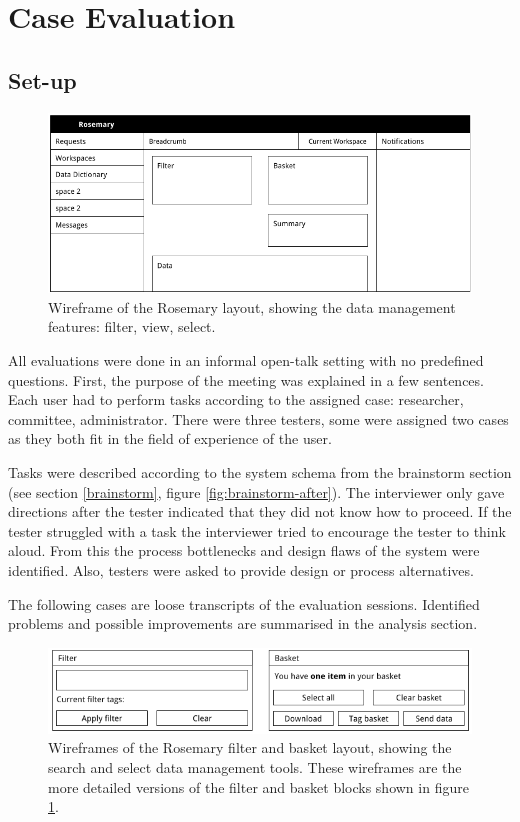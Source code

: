 \section{Case Evaluation}

\subsection{Set-up}
\label{evaluation-setup}

\begin{figure}[!b]
	\centering
	\includegraphics[width=1.0\linewidth]{images/evaluation-layout}
	\caption{
		Wireframe of the Rosemary layout, showing the data management features: filter, view, select.
	}
	\label{fig:evaluation-layout}
\end{figure}

All evaluations were done in an informal open-talk setting with no predefined questions.
First, the purpose of the meeting was explained in a few sentences.
Each user had to perform tasks according to the assigned case: researcher, committee, administrator.
There were three testers, some were assigned two cases as they both fit in the field of experience of the user.

Tasks were described according to the system schema from the brainstorm section (see section \ref{brainstorm}, figure \ref{fig:brainstorm-after}).
The interviewer only gave directions after the tester indicated that they did not know how to proceed.
If the tester struggled with a task the interviewer tried to encourage the tester to think aloud.
From this the process bottlenecks and design flaws of the system were identified.
Also, testers were asked to provide design or process alternatives.

The following cases are loose transcripts of the evaluation sessions.
Identified problems and possible improvements are summarised in the analysis section.

\begin{figure}[th]
	\centering
	\includegraphics[width=1.0\linewidth]{images/evaluation-basket-layout}
	\caption{
		Wireframes of the Rosemary filter and basket layout, showing the search and select data management tools.
		These wireframes are the more detailed versions of the filter and basket blocks shown in figure \ref{fig:evaluation-layout}.
	}
	\label{fig:evaluation-basket-layout}
\end{figure}

